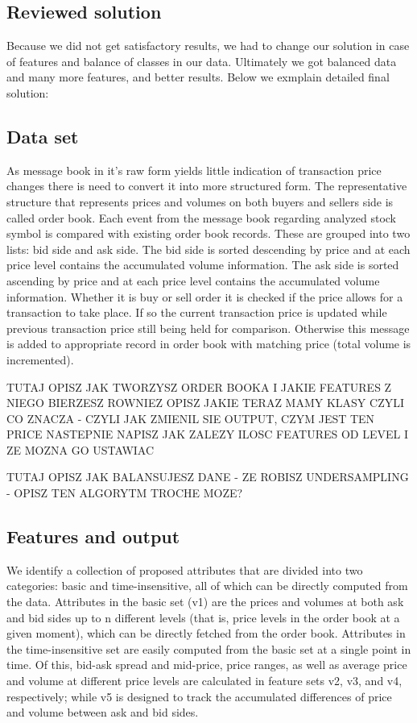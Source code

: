 \documentclass[twoside]{article}
\begin{document}
\begin{multicols}{2}
\section{Reviewed solution}

Because we did not get satisfactory results, we had to change our solution in case of features and
balance of classes in our data. Ultimately we got balanced data and many more features, and better results.
Below we exmplain detailed final solution:

\subsection{Data set}

As message book in it's raw form yields little indication of transaction price changes there is need to convert it into more structured form. The representative structure  that represents prices and volumes on both buyers and sellers side is called order book.
Each event from the message book regarding analyzed stock symbol is compared with existing order book records. These are grouped into two lists: bid side and ask side. The bid side is sorted descending by price and at each price level contains the accumulated volume information. The ask side is sorted ascending by price and at each price level contains the accumulated volume information. Whether it is buy or sell order it is checked if the price allows for a transaction to take place. If so the current transaction price is updated while previous transaction price still being held for comparison. Otherwise this message is added to appropriate record in order book with matching price (total volume is incremented).

TUTAJ OPISZ JAK TWORZYSZ ORDER BOOKA I JAKIE FEATURES Z NIEGO BIERZESZ
ROWNIEZ OPISZ JAKIE TERAZ MAMY KLASY CZYLI CO ZNACZA - CZYLI JAK ZMIENIL SIE OUTPUT, CZYM JEST TEN PRICE
NASTEPNIE NAPISZ JAK ZALEZY ILOSC FEATURES OD LEVEL I ZE MOZNA GO USTAWIAC

TUTAJ OPISZ JAK BALANSUJESZ DANE - ZE ROBISZ UNDERSAMPLING - OPISZ TEN ALGORYTM TROCHE MOZE?

\subsection{Features and output}
We identify a collection of proposed attributes that are divided into two categories: basic and time-insensitive, all of which can be directly computed from the data. Attributes in the basic set (v1) are the prices and volumes at both ask and bid sides up to n different levels (that is, price levels in the order book at a given moment), which can be directly fetched from the order book. Attributes in the time-insensitive set are easily computed from the basic set at a single point in time. Of this, bid-ask spread and mid-price, price ranges, as well as average price and volume at different price levels are calculated in feature sets v2, v3, and v4, respectively; while v5 is designed to track the accumulated differences of price and volume between ask and bid sides.


\end{multicols}
\end{document}
